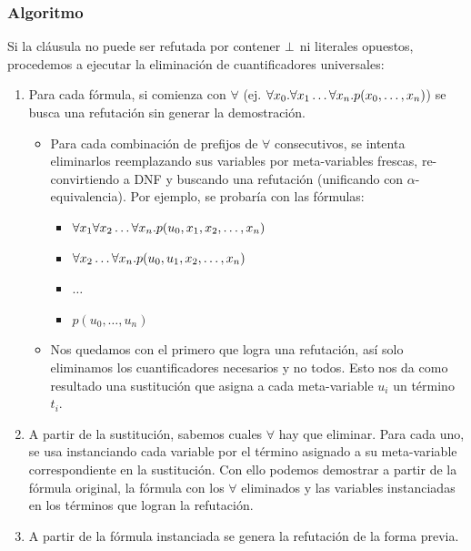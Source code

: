 \subsubsection{Algoritmo}

Si la cláusula no puede ser refutada por contener $\bot$ ni literales opuestos, procedemos a ejecutar la eliminación de cuantificadores universales:

\begin{enumerate}
    \item Para cada fórmula, si comienza con $\forall$ (ej. $\forall x_0 . \forall x_1 \dots \forall x_n . p(x_0, \dots, x_n)$) se busca una refutación sin generar la demostración.
    \begin{itemize}
        \item Para cada combinación de prefijos de $\forall$ consecutivos, se intenta eliminarlos reemplazando sus variables por meta-variables frescas, re-convirtiendo a DNF y buscando una refutación (unificando con $\alpha$-equivalencia). Por ejemplo, se probaría con las fórmulas:
        \begin{itemize}
            \item $\forall x_1 \forall x_2 \dots \forall x_n . p(u_0, x_1, x_2, \dots, x_n)$
            \item $\forall x_2 \dots \forall x_n . p(u_0, u_1, x_2, \dots, x_n)$
            \item $\dotso$
            \item $p(u_0, \dots, u_n)$
        \end{itemize}
        \item Nos quedamos con el primero que logra una refutación, así solo eliminamos los cuantificadores necesarios y no todos. Esto nos da como resultado una sustitución que asigna a cada meta-variable $u_i$ un término $t_i$.
    \end{itemize}
    \item A partir de la sustitución, sabemos cuales $\forall$ hay que eliminar. Para cada uno, se usa  instanciando cada variable por el término asignado a su meta-variable correspondiente en la sustitución. Con ello podemos demostrar a partir de la fórmula original, la fórmula con los $\forall$ eliminados y las variables instanciadas en los términos que logran la refutación.
    \item A partir de la fórmula instanciada se genera la refutación de la forma previa.
\end{enumerate}

